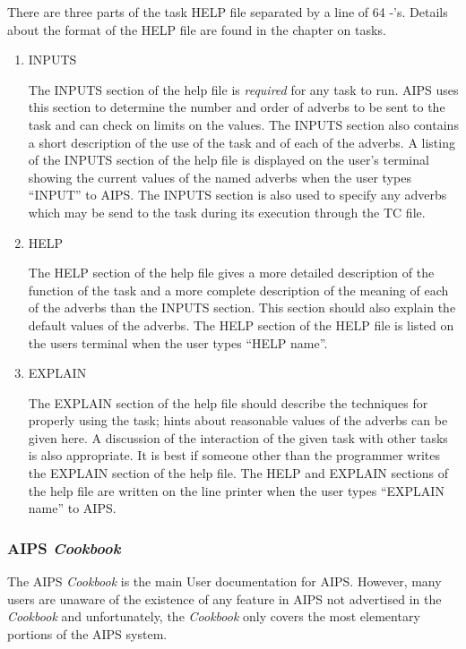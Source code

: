 There are three parts of the task HELP file separated by a line of 64
-'s. Details about the format of the HELP file are found in the
chapter on tasks.

\begin{enumerate} %
\item INPUTS

The INPUTS section of the help file is {\it required}  for any task to
run.  AIPS uses this section to determine the number and order of
adverbs to be sent to the task and can check on limits on the values.
The INPUTS section also contains a short description of the use of the
task and of each of the adverbs.  A listing of the INPUTS section of
the help file is displayed on the user's terminal showing the current
values of the named adverbs when the user types ``INPUT'' to AIPS.  The
INPUTS section is also used to specify any adverbs which may be send
to the task during its execution through the TC file.
\item HELP

The HELP section of the help file gives a more detailed description of
the function of the task and a more complete description of the
meaning of each of the adverbs than the INPUTS section.  This section
should also explain the default values of the adverbs.  The HELP
section of the HELP file is listed on the users terminal when the user
types ``HELP name''.
\item EXPLAIN

The EXPLAIN section of the help file should describe the techniques
for properly using the task; hints about reasonable values of the
adverbs can be given here.  A discussion of the interaction of the
given task with other tasks is also appropriate.  It is best if
someone other than the programmer writes the EXPLAIN section of the
help file.  The HELP and EXPLAIN sections of the help file are written
on the line printer when the user types ``EXPLAIN name'' to AIPS.

\end{enumerate} %
\subsubsection{AIPS {\it Cookbook}}
The AIPS {\it Cookbook} is the main User documentation for AIPS.
However, many users are unaware of the existence of any feature in
AIPS not advertised in the {\it Cookbook} and unfortunately, the {\it
Cookbook} only covers the most elementary portions of the AIPS system.


